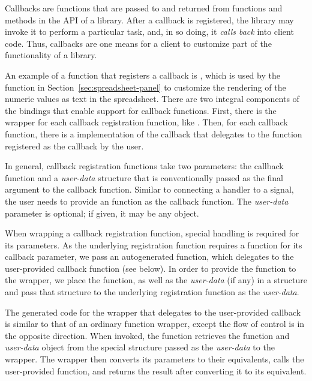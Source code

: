 \documentclass[article,shortnames]{jss}
\begin{document}

Callbacks are functions that are passed to and returned from functions
and methods in the API of a library. After a callback is registered,
the library may invoke it to perform a particular task, and, in so
doing, it \emph{calls back} into client code. Thus, callbacks are one
means for a client to customize part of the functionality of a
library.

An example of a function that registers a callback is
, which is used by the
 function in Section~\ref{sec:spreadsheet-panel} to customize the rendering of the numeric
values as text in the spreadsheet. There are two integral components
of the bindings that enable support for callback functions. First,
there is the wrapper for each callback registration function, like
. Then, for each callback
function, there is a  implementation of the callback that
delegates to the  function registered as the callback by
the user.

In general, callback registration functions take two parameters: the
callback function and a \emph{user-data} structure that is
conventionally passed as the final argument to the callback function.
Similar to connecting a handler to a signal, the user needs to provide
an  function as the callback function. The
\emph{user-data} parameter is optional; if given, it may be any
 object.

When wrapping a callback registration function, special handling is
required for its parameters. As the underlying 
registration function requires a  function for its
callback parameter, we pass an autogenerated  function,
which delegates to the user-provided  callback function
(see below). In order to provide the   function to the
 wrapper, we place the  function, as well as
the  \emph{user-data} (if any) in a structure and pass
that structure to the underlying  registration function as
the \emph{user-data}.

The generated code for the  wrapper that delegates to the
user-provided  callback is similar to that of an ordinary
function wrapper, except the flow of control is in the opposite
direction. When invoked, the function retrieves the 
function and \emph{user-data} object from the special structure passed
as the \emph{user-data} to the wrapper. The wrapper then converts its
parameters to their  equivalents, calls the user-provided
 function, and returns the result after converting it to
its  equivalent.
\end{document}
